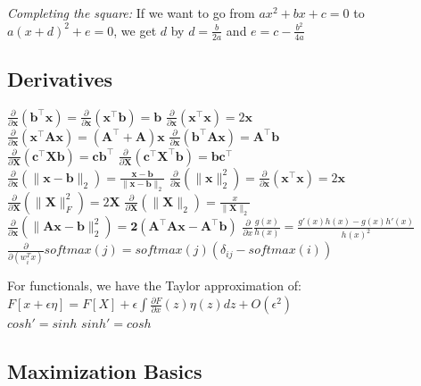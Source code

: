 \documentclass[9pt,parskip]{scrartcl}
\begin{document}
\begin{multicols*}{4}
\textit{Completing the square: }
If we want to go from $ax^2 + bx + c = 0$ to $a(x+d)^2 + e = 0$, 
we get $d$ by $d = \frac{b}{2a}$ and $e = c - \frac{b^2}{4a}$
\subsection*{Derivatives}
$\frac{\partial}{\partial \mathbf{x}}(\mathbf{b}^\top \mathbf{x}) = \frac{\partial}{\partial \mathbf{x}}(\mathbf{x}^\top \mathbf{b}) = \mathbf{b}$ \quad
$\frac{\partial}{\partial \mathbf{x}}(\mathbf{x}^\top \mathbf{x}) = 2\mathbf{x}$\\
$\frac{\partial}{\partial \mathbf{x}}(\mathbf{x}^\top \mathbf{A}\mathbf{x}) = (\mathbf{A}^\top + \mathbf{A})\mathbf{x}$ \quad
$\frac{\partial}{\partial \mathbf{x}}(\mathbf{b}^\top \mathbf{A}\mathbf{x}) = \mathbf{A}^\top \mathbf{b}$\\
$\frac{\partial}{\partial \mathbf{X}}(\mathbf{c}^\top \mathbf{X} \mathbf{b}) = \mathbf{c}\mathbf{b}^\top$ \quad
$\frac{\partial}{\partial \mathbf{X}}(\mathbf{c}^\top \mathbf{X}^\top \mathbf{b}) = \mathbf{b}\mathbf{c}^\top$\\
$\frac{\partial}{\partial \mathbf{x}}(\| \mathbf{x}-\mathbf{b} \|_2) = \frac{\mathbf{x}-\mathbf{b}}{\|\mathbf{x}-\mathbf{b}\|_2}$ \quad
$\frac{\partial}{\partial \mathbf{x}}(\|\mathbf{x}\|^2_2) = \frac{\partial}{\partial \mathbf{x}} (\mathbf{x}^\top \mathbf{x}) = 2\mathbf{x}$\\
$\frac{\partial}{\partial \mathbf{X}}(\|\mathbf{X}\|_F^2) = 2\mathbf{X}$ \quad
$\frac{\partial}{\partial \mathbf{X}}(\|\mathbf{X}\|_2) = \frac{x}{\|\mathbf{X}\|_2}$ \\ 

$\frac{\partial}{\partial \mathbf{x}}(\|\mathbf{Ax - b}\|_2^2) = \mathbf{2(A^\top Ax-A^\top b)}$
$\frac{\partial}{\partial x}\frac{g(x)}{h(x)} = \frac{g'(x)h(x) - g(x)h'(x)}{h(x)^2}$\\
$\frac{\partial}{\partial(w_i^Tx)}softmax(j)= softmax(j)(\delta_{ij} - softmax(i))$

For functionals, we have the Taylor approximation of: $F[x + \epsilon \eta] = F[X] + \epsilon \int \frac{\partial F}{\partial x}(z) \eta (z) dz + O(\epsilon ^2)$ \\
$cosh' = sinh$
$sinh' = cosh$

\subsection*{Maximization Basics}

\end{multicols*}
\end{document}
